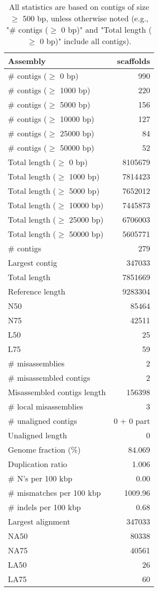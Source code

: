 \documentclass[12pt,a4paper]{article}
\begin{document}
\begin{table}[ht]
\begin{center}
\caption{All statistics are based on contigs of size $\geq$ 500 bp, unless otherwise noted (e.g., "\# contigs ($\geq$ 0 bp)" and "Total length ($\geq$ 0 bp)" include all contigs).}
\begin{tabular}{|l*{1}{|r}|}
\hline
Assembly & scaffolds \\ \hline
\# contigs ($\geq$ 0 bp) & 990 \\ \hline
\# contigs ($\geq$ 1000 bp) & 220 \\ \hline
\# contigs ($\geq$ 5000 bp) & 156 \\ \hline
\# contigs ($\geq$ 10000 bp) & 127 \\ \hline
\# contigs ($\geq$ 25000 bp) & 84 \\ \hline
\# contigs ($\geq$ 50000 bp) & 52 \\ \hline
Total length ($\geq$ 0 bp) & 8105679 \\ \hline
Total length ($\geq$ 1000 bp) & 7814423 \\ \hline
Total length ($\geq$ 5000 bp) & 7652012 \\ \hline
Total length ($\geq$ 10000 bp) & 7445873 \\ \hline
Total length ($\geq$ 25000 bp) & 6706003 \\ \hline
Total length ($\geq$ 50000 bp) & 5605771 \\ \hline
\# contigs & 279 \\ \hline
Largest contig & 347033 \\ \hline
Total length & 7851669 \\ \hline
Reference length & 9283304 \\ \hline
N50 & 85464 \\ \hline
N75 & 42511 \\ \hline
L50 & 25 \\ \hline
L75 & 59 \\ \hline
\# misassemblies & 2 \\ \hline
\# misassembled contigs & 2 \\ \hline
Misassembled contigs length & 156398 \\ \hline
\# local misassemblies & 3 \\ \hline
\# unaligned contigs & 0 + 0 part \\ \hline
Unaligned length & 0 \\ \hline
Genome fraction (\%) & 84.069 \\ \hline
Duplication ratio & 1.006 \\ \hline
\# N's per 100 kbp & 0.00 \\ \hline
\# mismatches per 100 kbp & 1009.96 \\ \hline
\# indels per 100 kbp & 0.68 \\ \hline
Largest alignment & 347033 \\ \hline
NA50 & 80338 \\ \hline
NA75 & 40561 \\ \hline
LA50 & 26 \\ \hline
LA75 & 60 \\ \hline
\end{tabular}
\end{center}
\end{table}
\end{document}
